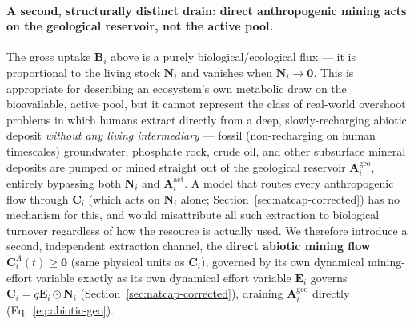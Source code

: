 \documentclass[twocolumn,10pt]{article}
\begin{document}
\paragraph{A second, structurally distinct drain: direct anthropogenic mining acts on the geological reservoir, not the active pool.} The gross uptake $\mathbf B_i$ above is a purely biological/ecological flux — it is proportional to the living stock $\mathbf N_i$ and vanishes when $\mathbf N_i\to\mathbf 0$. This is appropriate for describing an ecosystem's own metabolic draw on the bioavailable, active pool, but it cannot represent the class of real-world overshoot problems in which humans extract directly from a deep, slowly-recharging abiotic deposit \emph{without any living intermediary} — fossil (non-recharging on human timescales) groundwater, phosphate rock, crude oil, and other subsurface mineral deposits are pumped or mined straight out of the geological reservoir $\mathbf A^{\text{geo}}_i$, entirely bypassing both $\mathbf N_i$ and $\mathbf A^{\text{act}}_i$. A model that routes every anthropogenic flow through $\mathbf C_i$ (which acts on $\mathbf N_i$ alone; Section~\ref{sec:natcap-corrected}) has no mechanism for this, and would misattribute all such extraction to biological turnover regardless of how the resource is actually used. We therefore introduce a second, independent extraction channel, the \textbf{direct abiotic mining flow} $\mathbf C^A_i(t)\ge\mathbf 0$ (same physical units as $\mathbf C_i$), governed by its own dynamical mining-effort variable exactly as its own dynamical effort variable $\mathbf E_i$ governs $\mathbf C_i=q\mathbf E_i\odot\mathbf N_i$ (Section~\ref{sec:natcap-corrected}), draining $\mathbf A^{\text{geo}}_i$ directly (Eq.~\eqref{eq:abiotic-geo}).
\end{document}
